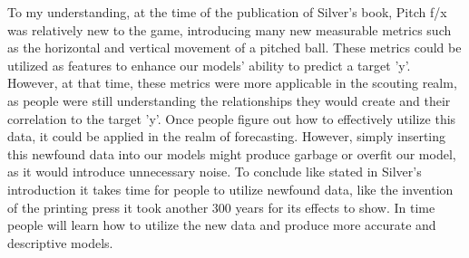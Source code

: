 \documentclass[12pt]{article}
\begin{document}
\begin{enumerate}
To my understanding, at the time of the publication of Silver's book, Pitch f/x was relatively new to the game, introducing many new measurable metrics such as the horizontal and vertical movement of a pitched ball. These metrics could be utilized as features to enhance our models' ability to predict a target 'y'. However, at that time, these metrics were more applicable in the scouting realm, as people were still understanding the relationships they would create and their correlation to the target 'y'. Once people figure out how to effectively utilize this data, it could be applied in the realm of forecasting. However, simply inserting this newfound data into our models might produce garbage or overfit our model, as it would introduce unnecessary noise. To conclude like stated in Silver's introduction it takes time for people to utilize newfound data, like the invention of the printing press it took another 300 years for its effects to show. In time people will learn how to utilize the new data and produce more accurate and descriptive models. \\ \\ \\ \\
\\


\end{enumerate}



\end{document}

